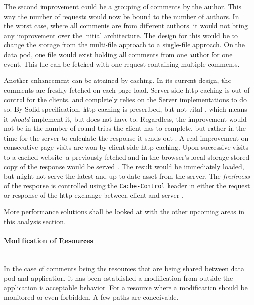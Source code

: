 The second improvement could be a grouping of comments by the author. This way the number of requests would now be bound to the number of authors. In the worst case, where all comments are from different authors, it would not bring any improvement over the initial architecture. The design for this would be to change the storage from the multi-file approach to a single-file approach. On the data pod, one file would exist holding all comments from one author for one event. This file can be fetched with one request containing multiple comments.

Another enhancement can be attained by caching. In its current design, the comments are freshly fetched on each page load. Server-side \gls{http} caching is out of control for the clients, and completely relies on the Server implementations to do so. By Solid specification, \gls{http} caching is prescribed, but not vital \cite{solid-protocol}, which means it \textit{should} implement it, but does not have to. Regardless, the improvement would not be in the number of round trips the client has to complete, but rather in the time for the server to calculate the response it sends out \cite{http-caching}. A real improvement on consecutive page visits are won by client-side \gls{http} caching. Upon successive visits to a cached website, a previously fetched and in the browser's local storage stored copy of the response would be served \cite{http-caching}. The result would be immediately loaded, but might not serve the latest and up-to-date asset from the server. The \textit{freshness} of the response is controlled using the \texttt{Cache-Control} header in either the request or response of the \gls{http} exchange between client and server \cite{http-caching}. 

More performance solutions shall be looked at with the other upcoming areas in this analysis section.
\vspace{0.5cm}
\paragraph{Modification of Resources}\mbox{}\\

In the case of comments being the resources that are being shared between data pod and application, it has been established a modification from outside the application is acceptable behavior. For a resource where a modification should be monitored or even forbidden. A few paths are conceivable.

